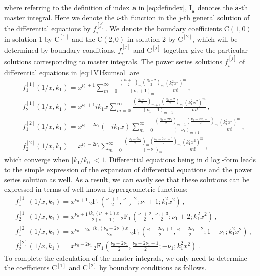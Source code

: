 \documentclass[a4paper,11pt]{article}
\newcommand{\nn}{\nonumber}
\newcommand{\nd}{\mathrm{d}}
\begin{document}
where referring to the definition of index $\tilde{\bm{a}}$ in \eqref{eq:defindex}, $\text{I}_{\tilde{\bm{a}}}$ denotes the $\tilde{\bm{a}}$-th master integral.
 Here we denote the $i$-th function in the $j$-th general solution of the differential equations by $f_i^{[j]}$. We denote the boundary coefficients $\text{C}(1,0)$ in solution 1 by $\text{C}^{[1]}$ and the $\text{C}(2,0)$ in solution 2 by $\text{C}^{[2]}$, which will be determined by boundary conditions. $f_i^{[j]}$ and  $\text{C}^{[j]}$ together give the particular solutions corresponding to master integrals. %
The power series solutions $f_i^{[j]}$ of differential equations in \eqref{eq:1V1fsumsol} are
\begin{align}
&f_1^{[1]}(1/x,k_1) = x^{\nu_0+1} \sum_{m=0}^\infty \frac{ \left(\frac{\nu_0+1}{2}\right)_m \left(\frac{\nu_0+2}{2}\right)_m   }{(\nu_1+1)_m }\frac{(k_1^2 x^2)^m}{m!} \,, \nn\\
&f_2^{[1]}(1/x,k_1)= x^{\nu_0+1}
i k_1 x \sum_{m=0}^\infty \frac{ \left(\frac{\nu_0+1}{2}\right)_{m+1} \left(\frac{\nu_0+2}{2}\right)_m   }{(\nu_1+1)_{m+1} }\frac{(k_1^2 x^2)^m}{m!}  \,, \nn\\
&f_1^{[2]}(1/x,k_1)= x^{\nu_0-2\nu_1} (-i k_1 x)\sum_{m=0}^\infty \frac{ \left(\frac{\nu_0-2\nu_1}{2}\right)_{m+1} \left(\frac{\nu_0-2\nu_1+1}{2}\right)_m   }{(-\nu_1)_{m+1} }\frac{(k_1^2 x^2)^m}{m!} \,, \nn\\
&f_2^{[2]}(1/x,k_1)  = x^{\nu_0-2\nu_1}\sum_{m=0}^\infty \frac{ \left(\frac{\nu_0-2\nu_1}{2}\right)_m \left(\frac{\nu_0-2\nu_1+1}{2}\right)_m   }{(-\nu_1)_m }\frac{(k_1^2 x^2)^m}{m!} \,, \label{eq:1V1fsolseriesk0inf}
\end{align}
which converge when $|k_1/k_0|<1$.
Differential equations being in $\nd \log$-form leads to the simple expression of the expansion of differential equations and the power series solution as well. As a result, we can easily see that these solutions can be expressed in terms of well-known hypergeometric functions: 
\begin{align}
&f_1^{[1]}(1/x,k_1) = x^{\nu_0+1} \, _2\text{F}_1\left(\frac{\nu _0+1}{2},\frac{\nu_0+2}{2};\nu _1+1;k_1^2 x^2\right) \,, \nn\\
&f_2^{[1]}(1/x,k_1)= x^{\nu_0+1}
\frac{i k_1 \left(\nu _0+1\right) x }{2 \left(\nu _1+1\right)} \,  _2\text{F}_1\left(\frac{\nu_0+2}{2},\frac{\nu_0+3}{2};\nu_1+2; k_1^2 x^2\right)  \,, \nn\\
&f_1^{[2]}(1/x,k_1)= x^{\nu_0-2\nu_1} \frac{i k_1 \left(\nu _0-2 \nu _1\right) x }{2 \nu _1} 
 \, _2\text{F}_1\left(\frac{\nu _0-2\nu_1+1}{2},\frac{\nu _0-2\nu_1+2}{2};1-\nu _1;  k_1^2 x^2\right) \,, \nn\\
&f_2^{[2]}(1/x,k_1)  = x^{\nu_0-2\nu_1} \, _2\text{F}_1\left(\frac{\nu _0-2\nu_1}{2},\frac{\nu _0-2\nu_1+1}{2};-\nu _1;k_1^2 x^2\right) \,. \label{eq:1V1fsolF-1}
\end{align}
 To complete the calculation of the master integrals, we only need to determine the coefficients $\text{C}^{[1]}$ and $\text{C}^{[2]}$ by boundary conditions as follows.
\end{document}
